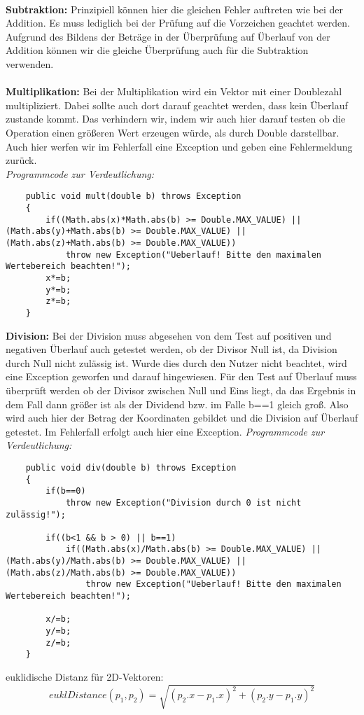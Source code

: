 \documentclass[a4paper,11pt]{scrartcl}
\begin{document}
\\
\textbf{Subtraktion:} Prinzipiell können hier die gleichen Fehler auftreten wie bei der Addition. Es muss lediglich bei der Prüfung auf die Vorzeichen geachtet werden. Aufgrund des Bildens der Beträge in der Überprüfung auf Überlauf von der Addition können wir die gleiche Überprüfung auch für die Subtraktion verwenden.\\
\\
\textbf{Multiplikation:} Bei der Multiplikation wird ein Vektor mit einer Doublezahl multipliziert. Dabei sollte auch dort darauf geachtet werden, dass kein Überlauf zustande kommt. Das verhindern wir, indem wir auch hier darauf testen ob die Operation einen größeren Wert erzeugen würde, als durch Double darstellbar. Auch hier werfen wir im Fehlerfall eine Exception und geben eine Fehlermeldung zurück.\\
\textit{Programmcode zur Verdeutlichung:}
\begin{lstlisting}
	public void mult(double b) throws Exception
	{
		if((Math.abs(x)*Math.abs(b) >= Double.MAX_VALUE) || (Math.abs(y)+Math.abs(b) >= Double.MAX_VALUE) || (Math.abs(z)+Math.abs(b) >= Double.MAX_VALUE))
			throw new Exception("Ueberlauf! Bitte den maximalen Wertebereich beachten!");
		x*=b;
		y*=b;
		z*=b;
	}
\end{lstlisting} $\;$ \\
\textbf{Division:} Bei der Division muss abgesehen von dem Test auf positiven und negativen Überlauf auch getestet werden, ob der Divisor Null ist, da Division durch Null nicht zulässig ist. Wurde dies durch den Nutzer nicht beachtet, wird eine Exception geworfen und darauf hingewiesen.
Für den Test auf Überlauf muss überprüft werden ob der Divisor zwischen Null und Eins liegt, da das Ergebnis in dem Fall dann größer ist als der Dividend bzw. im Falle b==1 gleich groß. Also wird auch hier der Betrag der Koordinaten gebildet und die Division auf Überlauf getestet. Im Fehlerfall erfolgt auch hier eine Exception.
\textit{Programmcode zur Verdeutlichung:}
\begin{lstlisting}
	public void div(double b) throws Exception
	{
		if(b==0)
			throw new Exception("Division durch 0 ist nicht zulässig!");
		
		if((b<1 && b > 0) || b==1)
			if((Math.abs(x)/Math.abs(b) >= Double.MAX_VALUE) || (Math.abs(y)/Math.abs(b) >= Double.MAX_VALUE) || (Math.abs(z)/Math.abs(b) >= Double.MAX_VALUE))
				throw new Exception("Ueberlauf! Bitte den maximalen Wertebereich beachten!");
		
		x/=b;
		y/=b;
		z/=b;
	}
\end{lstlisting} $\;$ \\
euklidische Distanz für 2D-Vektoren:
\[ euklDistance(p_1,p_2) = \sqrt{(p_2.x - p_1.x)^2 + (p_2.y - p_1.y)^2} \]
\end{document}
